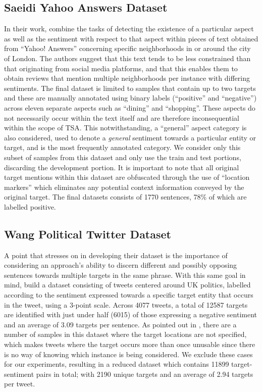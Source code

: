 \documentclass[../../fyp.tex]{subfiles}
\begin{document}
\subsection{Saeidi Yahoo Answers Dataset} \label{ds:saeidi}
In their work, \cite{saeidi2016} combine the tasks of detecting the existence of a particular aspect as well as the sentiment with respect to that aspect within pieces of text obtained from \enquote{Yahoo! Answers} concerning specific neighborhoods in or around the city of London. The authors suggest that this text tends to be less constrained than that originating from social media platforms, and that this enables them to obtain reviews that mention multiple neighborhoods per instance with differing sentiments. The final dataset is limited to samples that contain up to two targets and these are manually annotated using binary labels (\enquote{positive} and \enquote{negative}) across eleven separate aspects such as \enquote{dining} and \enquote{shopping}. These aspects do not necessarily occur within the text itself and are therefore inconsequential within the scope of TSA. This notwithstanding, a \enquote{general} aspect category is also considered, used to denote a \textit{general} sentiment towards a particular entity or target, and is the most frequently annotated category. We consider only this subset of samples from this dataset and only use the train and test portions, discarding the development portion. It is important to note that all original target mentions within this dataset are obfuscated through the use of \enquote{location markers} which eliminates any potential context information conveyed by the original target. The final datasets consists of 1770 sentences, 78\% of which are labelled positive. 

\subsection{Wang Political Twitter Dataset} \label{ds:wang} 
A point that \cite{saeidi2016} stresses on in developing their dataset is the importance of considering an approach's ability to discern different and possibly opposing sentences towards multiple targets in the same phrase. With this same goal in mind, \cite{wang2017} build a dataset consisting of tweets centered around UK politics, labelled according to the sentiment expressed towards a specific target entity that occurs in the tweet, using a 3-point scale. Across 4077 tweets, a total of 12587 targets are identified with just under half (6015) of those expressing a negative sentiment and an average of 3.09 targets per sentence. As pointed out in \cite{moore2018}, there are a number of samples in this dataset where the target locations are not specified, which makes tweets where the target occurs more than once unusable since there is no way of knowing which instance is being considered. We exclude these cases for our experiments, resulting in a reduced dataset which contains 11899 target-sentiment pairs in total; with 2190 unique targets and an average of 2.94 targets per tweet.
\end{document}
